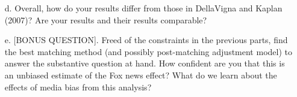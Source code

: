 \documentclass{article}
\begin{document}
\begin{itemize}
\item[d.] Overall, how do your results differ from those in DellaVigna and
  Kaplan (2007)? Are your results and their results comparable?  


\item[e.] [BONUS QUESTION]. Freed of the constraints in the previous
parts, find the best matching method (and possibly post-matching
  adjustment model) to answer the substantive question at hand. How
  confident are you that this is an unbiased estimate of the Fox news
  effect?  What do we learn about the effects of media bias from this analysis?    











\end{itemize}
\end{document}
